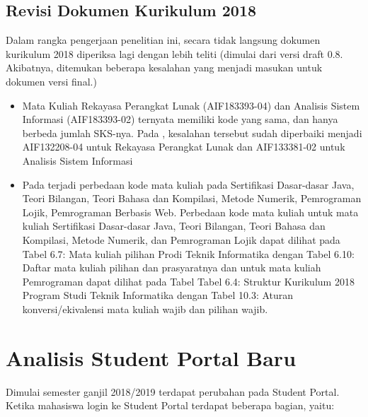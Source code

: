 \subsection{Revisi Dokumen Kurikulum 2018}
\label{subbab:revisidokumenkurikulum2018}

Dalam rangka pengerjaan penelitian ini, secara tidak langsung dokumen kurikulum 2018 diperiksa lagi dengan lebih teliti (dimulai dari versi draft 0.8. Akibatnya, ditemukan beberapa kesalahan yang menjadi masukan untuk dokumen versi final.)
\begin{itemize}
	\item Mata Kuliah Rekayasa Perangkat Lunak (AIF183393-04) dan Analisis Sistem Informasi (AIF183393-02) ternyata memiliki kode yang sama, dan hanya berbeda jumlah SKS-nya. Pada \cite{dokumenkurikulum2018}, kesalahan tersebut sudah diperbaiki menjadi AIF132208-04 untuk Rekayasa Perangkat Lunak dan AIF133381-02 untuk Analisis Sistem Informasi
	\item Pada \cite{dokumenkurikulum2018} terjadi perbedaan kode mata kuliah pada Sertifikasi Dasar-dasar Java, Teori Bilangan, Teori Bahasa dan Kompilasi, Metode Numerik, Pemrograman Lojik, Pemrograman Berbasis Web. Perbedaan kode mata kuliah untuk mata kuliah Sertifikasi Dasar-dasar Java, Teori Bilangan, Teori Bahasa dan Kompilasi, Metode Numerik, dan Pemrograman Lojik dapat dilihat pada \cite{dokumenkurikulum2018} Tabel 6.7: Mata kuliah pilihan Prodi Teknik Informatika dengan Tabel 6.10: Daftar mata kuliah pilihan dan prasyaratnya dan untuk mata kuliah Pemrograman dapat dilihat pada \cite{dokumenkurikulum2018} Tabel Tabel 6.4: Struktur Kurikulum 2018 Program Studi Teknik Informatika dengan Tabel 10.3: Aturan konversi/ekivalensi mata kuliah wajib dan pilihan wajib. 
\end{itemize}

\section{Analisis Student Portal Baru}

Dimulai semester ganjil 2018/2019 terdapat perubahan pada Student Portal. Ketika mahasiswa login ke Student Portal terdapat beberapa bagian, yaitu:

